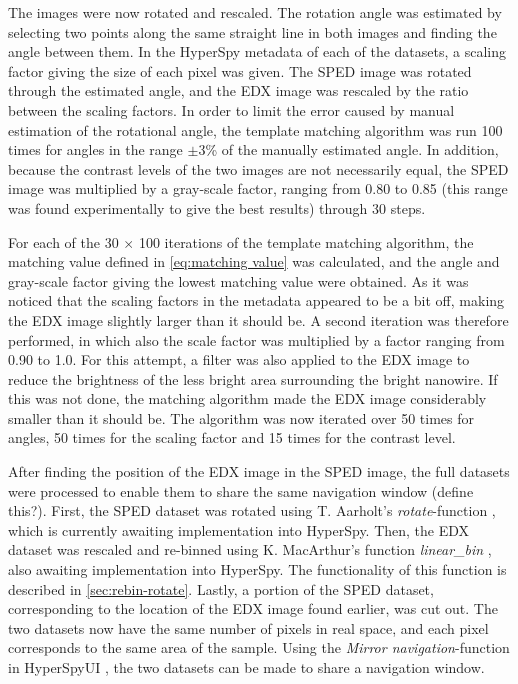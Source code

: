The images were now rotated and rescaled. The rotation angle was estimated by selecting two points along the same straight line in both images and finding the angle between them. In the HyperSpy metadata of each of the datasets, a scaling factor giving the size of each pixel was given. The SPED image was rotated through the estimated angle, and the EDX image was rescaled by the ratio between the scaling factors. In order to limit the error caused by manual estimation of the rotational angle, the template matching algorithm was run 100 times for angles in the range $\pm3$\% of the manually estimated angle. In addition, because the contrast levels of the two images are not necessarily equal, the SPED image was multiplied by a gray-scale factor, ranging from 0.80 to 0.85 (this range was found experimentally to give the best results) through 30 steps.

For each of the 30 $\times$ 100 iterations of the template matching algorithm, the matching value defined in \cref{eq:matching value} was calculated, and the angle and gray-scale factor giving the lowest matching value were obtained. As it was noticed that the scaling factors in the metadata appeared to be a bit off, making the EDX image slightly larger than it should be. A second iteration was therefore performed, in which also the scale factor was multiplied by a factor ranging from 0.90 to 1.0. For this attempt, a filter was also applied to the EDX image to reduce the brightness of the less bright area surrounding the bright nanowire. If this was not done, the matching algorithm made the EDX image considerably smaller than it should be. The algorithm was now iterated over 50 times for angles, 50 times for the scaling factor and 15 times for the contrast level.

After finding the position of the EDX image in the SPED image, the full datasets were processed to enable them to share the same navigation window (define this?). First, the SPED dataset was rotated using T. Aarholt's \textit{rotate}-function \cite{aarholt-rotation}, which is currently awaiting implementation into HyperSpy. Then, the EDX dataset was rescaled and re-binned using K. MacArthur's function \textit{linear\_bin} \cite{kate-binning}, also awaiting implementation into HyperSpy. The functionality of this function is described in \cref{sec:rebin-rotate}. Lastly, a portion of the SPED dataset, corresponding to the location of the EDX image found earlier, was cut out. The two datasets now have the same number of pixels in real space, and each pixel corresponds to the same area of the sample. Using the \textit{Mirror navigation}-function in HyperSpyUI \cite{hyperspyUI}, the two datasets can be made to share a navigation window. 


